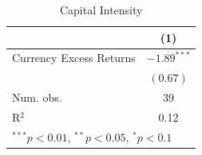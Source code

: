 \documentclass[12pt,english,round]{article}
\begin{document}
\begin{table}[htp]
\begin{center}
\caption{Capital Intensity}
\begin{tabular}{l c }
\hline
 & (1) \\
\hline
Currency Excess Returns & $-1.89^{***}$  \\
                        & $(0.67)$       \\
\hline
Num. obs.               & 39             \\
R$^2$                   & 0.12           \\
\hline
\multicolumn{2}{l}{\scriptsize{$^{***}p<0.01$, $^{**}p<0.05$, $^*p<0.1$}}
\end{tabular}
\end{center}
\end{table}
\end{document}
